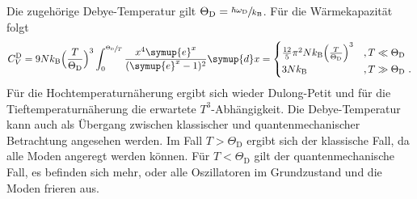     Die zugehörige Debye-Temperatur gilt $\Theta_\text{D} = \sfrac{\hbar\omega_\text{D}}{k_\text{B}}$.
    Für die Wärmekapazität folgt
    \begin{equation*}
        C^\text{D}_V = 9Nk_\text{B} \Bigl(\frac{T}{\Theta_\text{D}}\Bigr) ^3
        \int_0^{\sfrac{\Theta_\text{D}}{T}} \frac{x^4 \symup{e}^x}{(\symup{e}^x - 1)^2} \symup{d}x =
        \begin{cases}
            \frac{12}{5} \pi^2 N k_\text{B} \Bigl(\frac{T}{\Theta_\text{D}}\Bigr)^3 & , T \ll \Theta_\text{D} \\
            3Nk_\text{B} & , T \gg \Theta_\text{D} \ .
        \end{cases}
    \end{equation*}
    Für die Hochtemperaturnäherung ergibt sich wieder Dulong-Petit und für die Tieftemperaturnäherung die erwartete $T^3$-Abhängigkeit.
    Die Debye-Temperatur kann auch als Übergang zwischen klassischer und quantenmechanischer Betrachtung angesehen werden.
    Im Fall $T > \Theta_\text{D}$ ergibt sich der klassische Fall,
    da alle Moden angeregt werden können.
    Für $T < \Theta_\text{D}$ gilt der quantenmechanische Fall,
    es befinden sich mehr,
    oder alle Oszillatoren im Grundzustand und die Moden frieren aus.

